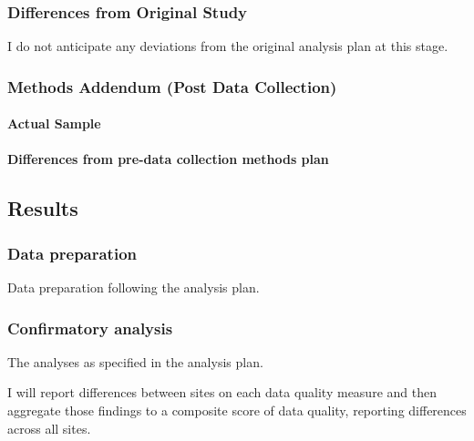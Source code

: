\documentclass[
]{article}
\begin{document}
\hypertarget{differences-from-original-study}{%
\subsubsection{Differences from Original
Study}\label{differences-from-original-study}}

I do not anticipate any deviations from the original analysis plan at
this stage.

\hypertarget{methods-addendum-post-data-collection}{%
\subsubsection{Methods Addendum (Post Data
Collection)}\label{methods-addendum-post-data-collection}}

\hypertarget{actual-sample}{%
\paragraph{Actual Sample}\label{actual-sample}}

\hypertarget{differences-from-pre-data-collection-methods-plan}{%
\paragraph{Differences from pre-data collection methods
plan}\label{differences-from-pre-data-collection-methods-plan}}

\hypertarget{results}{%
\subsection{Results}\label{results}}

\hypertarget{data-preparation}{%
\subsubsection{Data preparation}\label{data-preparation}}

Data preparation following the analysis plan.

\hypertarget{confirmatory-analysis}{%
\subsubsection{Confirmatory analysis}\label{confirmatory-analysis}}

The analyses as specified in the analysis plan.

I will report differences between sites on each data quality measure and
then aggregate those findings to a composite score of data quality,
reporting differences across all sites.
\end{document}
